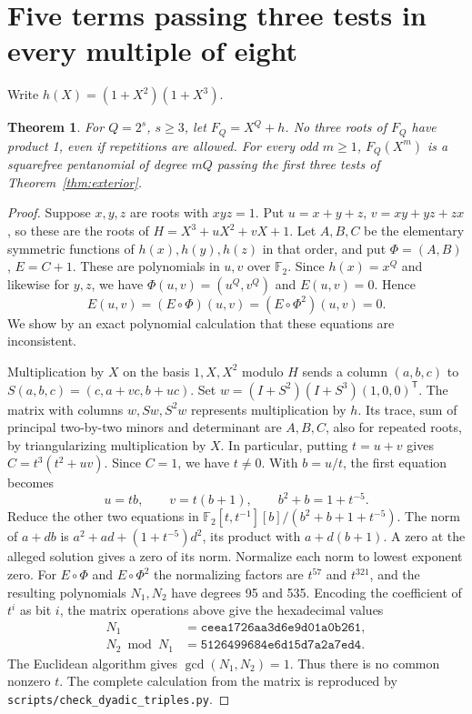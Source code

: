 \documentclass[11pt]{article}
\newtheorem{theorem}{Theorem}
\newcommand{\F}{\mathbb F_2}
\begin{document}
\section{Five terms passing three tests in every multiple of eight}
Write \(h(X)=(1+X^2)(1+X^3)\).
\begin{theorem}\label{thm:dyadic-triples}
For \(Q=2^s\), \(s\ge3\), let \(F_Q=X^Q+h\).
No three roots of \(F_Q\) have product 1, even if repetitions are allowed.
For every odd \(m\ge1\), \(F_Q(X^m)\) is a squarefree pentanomial
of degree \(mQ\) passing the first three tests of Theorem~\ref{thm:exterior}.
\end{theorem}
\begin{proof}
Suppose \(x,y,z\) are roots with \(xyz=1\).
Put \(u=x+y+z\), \(v=xy+yz+zx\), so these are the roots of
\(H=X^3+uX^2+vX+1\). Let \(A,B,C\) be the elementary symmetric
functions of \(h(x),h(y),h(z)\) in that order, and put \(\Phi=(A,B)\),
\(E=C+1\). These are polynomials in \(u,v\) over \(\F\).
Since \(h(x)=x^Q\) and likewise for \(y,z\), we have
\(\Phi(u,v)=(u^Q,v^Q)\) and \(E(u,v)=0\). Hence
\[
              E(u,v)=(E\circ\Phi)(u,v)=(E\circ\Phi^2)(u,v)=0 .
\]
We show by an exact polynomial calculation that these equations are inconsistent.

Multiplication by \(X\) on the basis \(1,X,X^2\) modulo \(H\) sends a
column \((a,b,c)\) to \(S(a,b,c)=(c,a+vc,b+uc)\). Set
\(w=(I+S^2)(I+S^3)(1,0,0)^{\mathsf T}\).
The matrix with columns \(w,Sw,S^2w\) represents multiplication by \(h\).
Its trace, sum of principal two-by-two minors and determinant are
\(A,B,C\), also for repeated roots, by triangularizing multiplication by \(X\).
In particular, putting \(t=u+v\) gives \(C=t^3(t^2+uv)\).
Since \(C=1\), we have \(t\ne0\). With \(b=u/t\), the first equation becomes
\[
              u=tb,\qquad v=t(b+1),\qquad b^2+b=1+t^{-5}.
\]
Reduce the other two equations in
\(\F[t,t^{-1}][b]/(b^2+b+1+t^{-5})\).
The norm of \(a+db\) is \(a^2+ad+(1+t^{-5})d^2\), its product with
\(a+d(b+1)\). A zero at the alleged solution gives a zero of its norm.
Normalize each norm to lowest exponent zero. For
\(E\circ\Phi\) and \(E\circ\Phi^2\) the normalizing factors are
\(t^{57}\) and \(t^{321}\), and the resulting polynomials \(N_1,N_2\)
have degrees 95 and 535. Encoding the coefficient of \(t^i\) as bit \(i\),
the matrix operations above give the hexadecimal values
\[
\begin{aligned}
 N_1 &= \mathtt{ceea1726aa3d6e9d01a0b261},\\
 N_2\bmod N_1 &= \mathtt{5126499684e6d15d7a2a7ed4}.
\end{aligned}
\]
The Euclidean algorithm gives \(\gcd(N_1,N_2)=1\). Thus there is no common
nonzero \(t\). The complete calculation from the matrix is reproduced by
\texttt{scripts/check\_dyadic\_triples.py}.


\end{proof}
\end{document}
